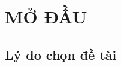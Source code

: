 \documentclass{report} %
\begin{document}


% 

% 

% 

% 

% 

% 

% 





% 

% 

% 

% 

% 


\chapter*{\centering MỞ ĐẦU}


\section*{Lý do chọn đề tài}



% 
\end{document}
